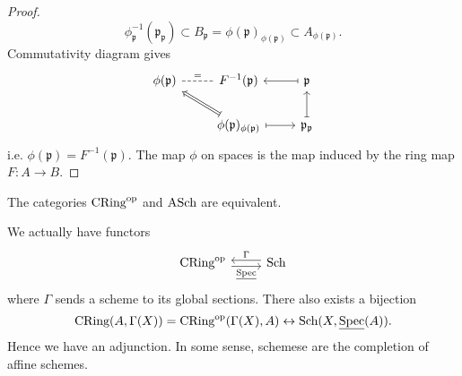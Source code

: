 \documentclass[12pt]{article}
\begin{document}
\begin{proof}
	\begin{equation*}
		\phi^{-1}_\mathfrak{p}(\mathfrak{p}_\mathfrak{p})\subset B_\mathfrak{p}= \phi(\mathfrak{p})_{\phi(\mathfrak{p})}\subset A_{\phi(\mathfrak{p})}.
	\end{equation*}
	Commutativity diagram gives 
	\begin{equation*}
\begin{tikzcd}
\phi(\mathfrak{p}) \arrow[r, "=", no head, dashed] & F^{-1}(\mathfrak{p})                                                                       & \mathfrak{p} \arrow[l, maps to]              \\
                                                   & \phi(\mathfrak{p})_{\phi(\mathfrak{p})} \arrow[r, maps to] \arrow[lu, Rightarrow, maps to] & \mathfrak{p}_\mathfrak{p} \arrow[u, maps to]
\end{tikzcd}
	\end{equation*}
	i.e. $\phi(\mathfrak{p})=F^{-1}(\mathfrak{p})$. The map $\phi$ on spaces is the map induced by the ring map $F:A\to B$.
\end{proof}

\begin{corollary}
	The categories $\text{CRing}^{\text{op}}$ and $\text{ASch}$ are equivalent.
\end{corollary}

\begin{remark}
	We actually have functors 
	\begin{equation*}
\begin{tikzcd}
\text{CRing}^\text{op} \arrow[r, "\underline{\text{Spec}}"', shift right] & \text{Sch} \arrow[l, "\Gamma"', shift right]
\end{tikzcd}
	\end{equation*}
	where $\Gamma$ sends a scheme to its global sections. There also exists a bijection 
	\begin{equation*}
		\text{CRing}(A,\Gamma(X))=\text{CRing}^{\text{op}}(\Gamma(X), A) \leftrightarrow \text{Sch}(X,\underline{\text{Spec}}(A)).
	\end{equation*}
	Hence we have an adjunction. In some sense, schemese are the completion of affine schemes.
\end{remark}
\end{document}
